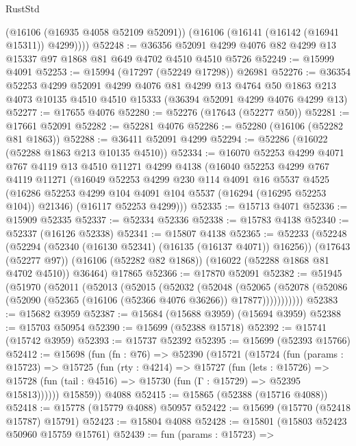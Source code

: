 \begin{lexlean}{RustStd}
\begin{coremodule}
        (@16106 (@16935 @4058 @52109 @52091))
        (@16106 (@16141 (@16142 (@16941 @15311)) @4299))))
@52248 := @36356 @52091 @4299 @4076 @82 @4299 @13 @15337 @97 @1868 @81 @649 @4702 @4510 @4510 @5726
@52249 := @15999 @4091
@52253 := @15994 (@17297 (@52249 @17298)) @26981
@52276 := @36354
    @52253
    @4299
    @52091
    @4299
    @4076
    @81
    @4299
    @13
    @4764
    @50
    @1863
    @213
    @4073
    @10135
    @4510
    @4510
    @15333
    (@36394 @52091 @4299 @4076 @4299 @13)
@52277 := @17655 @4076
@52280 := @52276 (@17643 (@52277 @50))
@52281 := @17661 @52091
@52282 := @52281 @4076
@52286 := @52280 (@16106 (@52282 @81 @1863))
@52288 := @36411 @52091 @4299
@52294 := @52286 (@16022 (@52288 @1863 @213 @10135 @4510))
@52334 := @16070
    @52253
    @4299
    @4071
    @767
    @4119
    @13
    @4510
    @11271
    @4299
    @4138
    (@16040
      @52253
      @4299
      @767
      @4119
      @11271
      (@16049
        @52253
        @4299
        @230
        @114
        @4091
        @16
        @5537
        @4525
        (@16286 @52253 @4299 @104 @4091 @104 @5537 (@16294 (@16295 @52253 @104)) @21346)
        (@16117 @52253 @4299)))
@52335 := @15713 @4071
@52336 := @15909 @52335
@52337 := @52334 @52336
@52338 := @15783 @4138
@52340 := @52337 (@16126 @52338)
@52341 := @15807 @4138
@52365 := @52233
    (@52248
      (@52294 (@52340 (@16130 @52341) (@16135 (@16137 @4071)) @16256))
      (@17643 (@52277 @97))
      (@16106 (@52282 @82 @1868))
      (@16022 (@52288 @1868 @81 @4702 @4510))
      @36464)
    @17865
@52366 := @17870 @52091
@52382 := @51945
    (@51970
      (@52011
        (@52013
          (@52015
            (@52032
              (@52048
                (@52065
                  (@52078 (@52086 (@52090 (@52365 (@16106 (@52366 @4076 @36266)) @17877)))))))))))
@52383 := @15682 @3959
@52387 := @15684 (@15688 @3959) (@15694 @3959)
@52388 := @15703 @50954
@52390 := @15699 (@52388 @15718)
@52392 := @15741 (@15742 @3959)
@52393 := @15737 @52392
@52395 := @15699 (@52393 @15766)
@52412 := @15698
    (fun (fn : @76) =>
    @52390
      (@15721
        (@15724
          (fun (params : @15723) =>
          @15725
            (fun (rty : @4214) =>
            @15727
              (fun (lets : @15726) =>
              @15728 (fun (tail : @4516) => @15730 (fun (Γ : @15729) => @52395 @15813))))))
        @15859))
    @4088
@52415 := @15865 (@52388 (@15716 @4088))
@52418 := @15778 (@15779 @4088) @50957
@52422 := @15699 (@15770 (@52418 @15787) @15791)
@52423 := @15804 @4088
@52428 := @15801 (@15803 @52423 @50960 @15759 @15761)
@52439 := fun (params : @15723) =>

\end{coremodule}
\end{lexlean}
